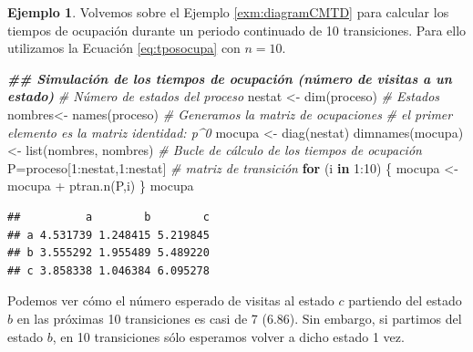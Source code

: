 \documentclass[
]{book}
\newenvironment{Shaded}{\begin{snugshade}}{\end{snugshade}}
\newcommand{\CommentTok}[1]{\textcolor[rgb]{0.56,0.35,0.01}{\textit{#1}}}
\newcommand{\ControlFlowTok}[1]{\textcolor[rgb]{0.13,0.29,0.53}{\textbf{#1}}}
\newcommand{\DecValTok}[1]{\textcolor[rgb]{0.00,0.00,0.81}{#1}}
\newcommand{\DocumentationTok}[1]{\textcolor[rgb]{0.56,0.35,0.01}{\textbf{\textit{#1}}}}
\newcommand{\FunctionTok}[1]{\textcolor[rgb]{0.00,0.00,0.00}{#1}}
\newcommand{\NormalTok}[1]{#1}
\newcommand{\OtherTok}[1]{\textcolor[rgb]{0.56,0.35,0.01}{#1}}
\newcommand{\SpecialCharTok}[1]{\textcolor[rgb]{0.00,0.00,0.00}{#1}}
\theoremstyle{definition}
\theoremstyle{definition}
\newtheorem{example}{Ejemplo}[chapter]
\theoremstyle{definition}
\theoremstyle{definition}
\theoremstyle{remark}
\begin{document}
\begin{example}
Volvemos sobre el Ejemplo \ref{exm:diagramCMTD} para calcular los tiempos de ocupación durante un periodo continuado de 10 transiciones. Para ello utilizamos la Ecuación \eqref{eq:tposocupa} con \(n=10\).

\begin{Shaded}
\begin{Highlighting}[]
\DocumentationTok{\#\# Simulación de los tiempos de ocupación (número de visitas a un estado)}
\CommentTok{\# Número de estados del proceso}
\NormalTok{nestat }\OtherTok{\textless{}{-}} \FunctionTok{dim}\NormalTok{(proceso)}
\CommentTok{\# Estados}
\NormalTok{nombres}\OtherTok{\textless{}{-}} \FunctionTok{names}\NormalTok{(proceso)}
\CommentTok{\# Generamos la matriz de ocupaciones}
\CommentTok{\# el primer elemento es la matriz identidad: p\^{}0}
\NormalTok{mocupa }\OtherTok{\textless{}{-}} \FunctionTok{diag}\NormalTok{(nestat)}
  \FunctionTok{dimnames}\NormalTok{(mocupa) }\OtherTok{\textless{}{-}} \FunctionTok{list}\NormalTok{(nombres, nombres)}
\CommentTok{\# Bucle de cálculo de los tiempos de ocupación}
\NormalTok{P}\OtherTok{=}\NormalTok{proceso[}\DecValTok{1}\SpecialCharTok{:}\NormalTok{nestat,}\DecValTok{1}\SpecialCharTok{:}\NormalTok{nestat] }\CommentTok{\# matriz de transición}
\ControlFlowTok{for}\NormalTok{ (i }\ControlFlowTok{in} \DecValTok{1}\SpecialCharTok{:}\DecValTok{10}\NormalTok{)}
\NormalTok{\{}
\NormalTok{   mocupa }\OtherTok{\textless{}{-}}\NormalTok{ mocupa }\SpecialCharTok{+} \FunctionTok{ptran.n}\NormalTok{(P,i)}
\NormalTok{\}}
\NormalTok{mocupa}
\end{Highlighting}
\end{Shaded}

\begin{verbatim}
##          a        b        c
## a 4.531739 1.248415 5.219845
## b 3.555292 1.955489 5.489220
## c 3.858338 1.046384 6.095278
\end{verbatim}

Podemos ver cómo el número esperado de visitas al estado \(c\) partiendo del estado \(b\) en las próximas 10 transiciones es casi de 7 (6.86). Sin embargo, si partimos del estado \(b\), en 10 transiciones sólo esperamos volver a dicho estado 1 vez.
\end{example}
\end{document}
